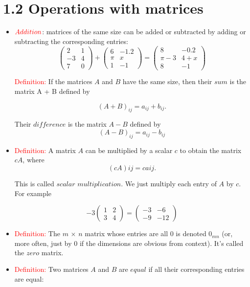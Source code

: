 \documentclass{book}
\begin{document}
\section*{1.2 Operations with matrices}
\begin{itemize}
	\item $\textcolor{red}{Addition}$: matrices of the same size can be added or subtracted by adding or subtracting the corresponding entries:
		$$ \begin{pmatrix} 2 & 1 \\
		-3 & 4 \\
			7 & 0\end{pmatrix} + \begin{pmatrix} 6 & -1.2 \\
		\pi & x \\
			1 & -1\end{pmatrix} = \begin{pmatrix} 8 & -0.2 \\
		\pi - 3 & 4 + x \\
		8 & -1\end{pmatrix} $$

		\textcolor{red}{Definition:} If the matrices $A$ and $B$ have the same size, then their $sum$ is the matrix A + B defined by

		$$ (A + B)_{ij} = a_{ij} + b_{ij}. $$

Their $difference$ is the matrix $A − B$ defined by
		$$ (A − B)_{ij} = a_{ij} − b_{ij} $$

	\item \textcolor{red}{Definition:} A matrix $A$ can be multiplied by a scalar $c$ to obtain the matrix $cA$, where	
$$ (cA) ij = ca ij . $$

This is called $scalar$ $multiplication$. We just multiply each entry of $A$ by $c$. For example

		$$ -3\begin{pmatrix} 1 & 2 \\
		3 & 4 \end{pmatrix} = \begin{pmatrix} -3 & -6 \\
		-9 & -12 \end{pmatrix}$$
	\item \textcolor{red}{Definition:} The $m$ $\times$ $n$ matrix whose entries are all 0 is denoted $0_{mn}$ (or, more often, just by 0 if the dimensions are obvious from context). It’s called the $zero$ matrix.
	\item \textcolor{red}{Definition:} Two matrices $A$ and $B$ are $equal$ if all their corresponding entries are equal:


\end{itemize}
\end{document}
